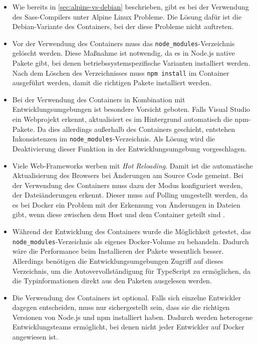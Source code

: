 \begin{itemize}
    \item Wie bereits in \cref{sec:alpine-vs-debian} beschrieben, gibt es bei der Verwendung des Sass-Compilers unter Alpine Linux Probleme.
        Die Lösung dafür ist die Debian-Variante des Containers, bei der diese Probleme nicht auftreten.
    \item Vor der Verwendung des Containers muss das \verb|node_modules|-Verzeichnis gelöscht werden.
        Diese Maßnahme ist notwendig, da es in Node.js native Pakete gibt, bei denen betriebssystemspezifische Varianten installiert werden.
        Nach dem Löschen des Verzeichnisses muss \verb|npm install| im Container ausgeführt werden, damit die richtigen Pakete installiert werden.
    \item Bei der Verwendung des Containers in Kombination mit Entwicklungsumgebungen ist besondere Vorsicht geboten.
        Falls \zB Visual Studio ein Webprojekt erkennt, aktualisiert es im Hintergrund automatisch die npm-Pakete.
        Da dies allerdings außerhalb des Containers geschieht, entstehen Inkonsistenzen im \verb|node_modules|-Verzeichnis.
        Als Lösung wird die Deaktivierung dieser Funktion in der Entwicklungsumgebung vorgeschlagen.
    \item Viele Web-Frameworks werben mit \emph{Hot Reloading}.
        Damit ist die automatische Aktualisierung des Browsers bei Änderungen am Source Code gemeint.
        Bei der Verwendung des Containers muss dazu der Modus konfiguriert werden, der Dateiänderungen erkennt.
        Dieser muss auf Polling umgestellt werden, da es bei Docker ein Problem mit der Erkennung von Änderungen in Dateien gibt, wenn diese zwischen dem Host und dem Container geteilt sind \autocite{Docker.inotify-problem:online}. 
    \item Während der Entwicklung des Containers wurde die Möglichkeit getestet, das \verb|node_modules|-Verzeichnis als eigenes Docker-Volume zu behandeln.
        Dadurch wäre die Performance beim Installieren der Pakete wesentlich besser.
        Allerdings benötigen die Entwicklungsumgebungen Zugriff auf dieses Verzeichnis, um die Autovervollständigung für TypeScript zu ermöglichen, da die Typinformationen direkt aus den Paketen ausgelesen werden.
    \item Die Verwendung des Containers ist optional.
        Falls sich einzelne Entwickler dagegen entscheiden, muss nur sichergestellt sein, dass sie die richtigen Versionen von Node.js und npm installiert haben.
        Dadurch werden heterogene Entwicklungsteams ermöglicht, bei denen nicht jeder Entwickler auf Docker angewiesen ist.
\end{itemize}
